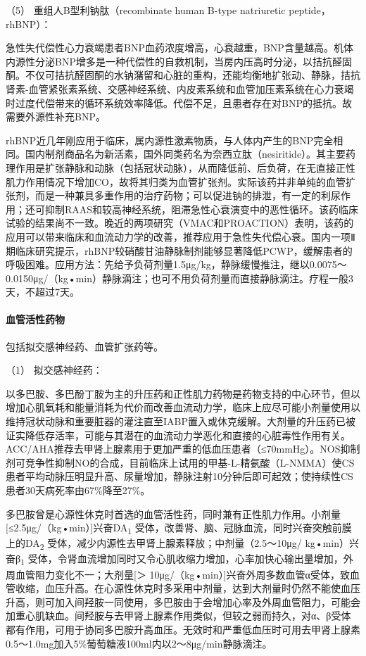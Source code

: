 \hypertarget{text00059.htmlux5cux23CHP2-3-3-2-1-5}{}
（5） 重组人B型利钠肽（recombinate human B-type natriuretic
peptide，rhBNP）：

急性失代偿性心力衰竭患者BNP血药浓度增高，心衰越重，BNP含量越高。机体内源性分泌BNP增多是一种代偿性的自救机制，当房内压高时分泌，以拮抗醛固酮。不仅可拮抗醛固酮的水钠潴留和心脏的重构，还能均衡地扩张动、静脉，拮抗肾素-血管紧张素系统、交感神经系统、内皮素系统和血管加压素系统在心力衰竭时过度代偿带来的循环系统效率降低。代偿不足，且患者存在对BNP的抵抗。故需要外源性补充BNP。

rhBNP近几年刚应用于临床，属内源性激素物质，与人体内产生的BNP完全相同。国内制剂商品名为新活素，国外同类药名为奈西立肽（nesiritide）。其主要药理作用是扩张静脉和动脉（包括冠状动脉），从而降低前、后负荷，在无直接正性肌力作用情况下增加CO，故将其归类为血管扩张剂。实际该药并非单纯的血管扩张剂，而是一种兼具多重作用的治疗药物；可以促进钠的排泄，有一定的利尿作用；还可抑制RAAS和较高神经系统，阻滞急性心衰演变中的恶性循环。该药临床试验的结果尚不一致。晚近的两项研究（VMAC和PROACTION）表明，该药的应用可以带来临床和血流动力学的改善，推荐应用于急性失代偿心衰。国内一项Ⅱ期临床研究提示，rhBNP较硝酸甘油静脉制剂能够显著降低PCWP，缓解患者的呼吸困难。应用方法：先给予负荷剂量1.5μg/kg，静脉缓慢推注，继以0.0075～0.0150μg/（kg•min）静脉滴注；也可不用负荷剂量而直接静脉滴注。疗程一般3天，不超过7天。

\paragraph{血管活性药物}

包括拟交感神经药、血管扩张药等。

\hypertarget{text00059.htmlux5cux23CHP2-3-3-2-2-1}{}
（1） 拟交感神经药：

以多巴胺、多巴酚丁胺为主的升压药和正性肌力药物是药物支持的中心环节，但以增加心肌氧耗和能量消耗为代价而改善血流动力学，临床上应尽可能小剂量使用以维持冠状动脉和重要脏器的灌注直至IABP置入或休克缓解。大剂量的升压药已被证实降低存活率，可能与其潜在的血流动力学恶化和直接的心脏毒性作用有关。ACC/AHA推荐去甲肾上腺素用于更加严重的低血压患者（≤70mmHg）。NOS抑制剂可竞争性抑制NO的合成，目前临床上试用的甲基-L-精氨酸（L-NMMA）使CS患者平均动脉压明显升高、尿量增加，静脉注射10分钟后即可起效；使持续性CS患者30天病死率由67\%降至27\%。

多巴胺曾是心源性休克时首选的血管活性药，同时兼有正性肌力作用。小剂量{[}≤2.5μg/（kg•min）{]}兴奋DA\textsubscript{1}
受体，改善肾、脑、冠脉血流，同时兴奋突触前膜上的DA\textsubscript{2}
受体，减少内源性去甲肾上腺素释放；中剂量（2.5～10μg/
kg•min）兴奋β\textsubscript{1}
受体，令肾血流增加同时又令心肌收缩力增加，心率加快心输出量增加，外周血管阻力变化不一；大剂量{[}＞
10μg/（kg•min）{]}兴奋外周多数血管α受体，致血管收缩，血压升高。在心源性休克时多采用中剂量，达到大剂量时仍然不能使血压升高，则可加入间羟胺一同使用，多巴胺由于会增加心率及外周血管阻力，可能会加重心肌缺血。间羟胺与去甲肾上腺素作用类似，但较之弱而持久，对α、β受体都有作用，可用于协同多巴胺升高血压。无效时和严重低血压时可用去甲肾上腺素0.5～1.0mg加入5\%葡萄糖液100ml内以2～8μg/min静脉滴注。

